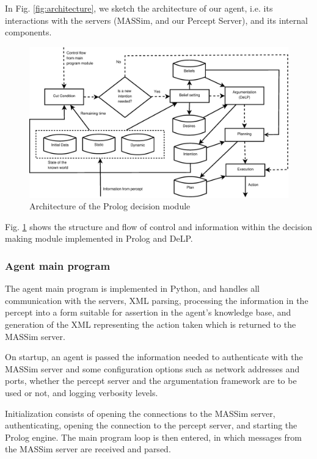     In Fig. \ref{fig:architecture}, we sketch the architecture of our agent, 
    i.e. its interactions with the servers (MASSim, and our Percept Server), 
    and its internal components.

    \begin{figure}[!htb]
    \centering
    \includegraphics[width=\textwidth]{agentprolog.eps}
    \caption{Architecture of the Prolog decision module}
    \label{fig:prologmodule}
    \end{figure}

    Fig. \ref{fig:prologmodule} shows the structure and flow of control and
    information within the decision making module implemented in Prolog and
    DeLP.
    
\subsubsection{Agent main program}
    The agent main program is implemented in Python, and handles all
    communication with the servers, XML parsing, processing the information in
    the percept into a form suitable for assertion in the agent's knowledge
    base, and generation of the XML representing the action taken which is
    returned to the MASSim server.

    On startup, an agent is passed the information needed to authenticate with
    the MASSim server and some configuration options such as network addresses
    and ports, whether the percept server and the argumentation framework are to
    be used or not, and logging verbosity levels.

    Initialization consists of opening the connections to the MASSim server,
    authenticating, opening the connection to the percept server, and starting
    the Prolog engine. The main program loop is then entered, in which messages
    from the MASSim server are received and parsed. 

